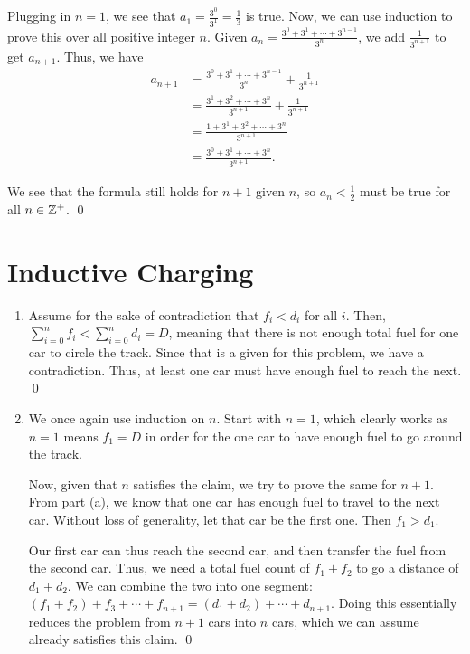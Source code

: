 \documentclass{article}
\begin{document}
Plugging in $n=1$, we see that $a_1 = \frac{3^0}{3^1} = \frac{1}{3}$ is true. Now,
we can use induction to prove this over all positive integer $n$. Given 
$a_n = \frac{3^0 + 3^1 + \cdots + 3^{n-1}}{3^n}$, we add $\frac{1}{3^{n+1}}$ to get 
$a_{n+1}$. Thus, we have 
\begin{align*}
	a_{n+1} &= \frac{3^0 + 3^1 + \cdots + 3^{n-1}}{3^n} + \frac{1}{3^{n+1}} \\
	&= \frac{3^1 + 3^2 + \cdots + 3^n}{3^{n+1}} + \frac{1}{3^{n+1}} \\
	&= \frac{1 + 3^1 + 3^2 + \cdots + 3^n}{3^{n+1}} \\
	&= \frac{3^0 + 3^1 + \cdots + 3^n}{3^{n+1}}.
\end{align*}

We see that the formula still holds for $n+1$ given $n$, so $a_n < \frac{1}{2}$ must be 
true for all $n \in \mathbb Z^+$. \qed

\section{Inductive Charging}
\begin{enumerate}[label=\alph*.]
	\item Assume for the sake of contradiction that $f_i < d_i$ for all $i$. 
		Then, $\sum_{i=0}^{n} f_i < \sum_{i=0}^n d_i = D$, meaning that 
		there is not enough total fuel for one car to circle the track. 
		Since that is a given for this problem, we have a contradiction. 
		Thus, at least one car must have enough fuel to reach the next. \qed
	\item We once again use induction on $n$. Start with $n=1$, which clearly works 
		as $n=1$ means $f_1 = D$ in order for the one car to have enough fuel to go 
		around the track. 

		Now, given that $n$ satisfies the claim, we try to prove the same for $n+1$. 
		From part (a), we know that one car has enough fuel to travel to the next car. 
		Without loss of generality, let that car be the first one. Then $f_1 > d_1$. 

		Our first car can thus reach the second car, and then transfer the fuel from the second 
		car. Thus, we need a total fuel count of $f_1 + f_2$ to go a distance of 
		$d_1 + d_2$. We can combine the two into one segment: $(f_1+f_2) + f_3 + \cdots + f_{n+1} = (d_1+d_2) 
		+ \cdots + d_{n+1}$. Doing this essentially reduces the problem from $n+1$ cars into $n$ cars,
		which we can assume already satisfies this claim. \qed 
\end{enumerate}
\end{document}

